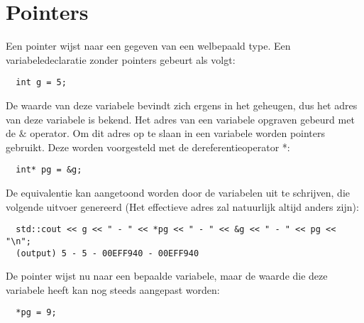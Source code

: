 \documentclass{report}
\begin{document}
	\tableofcontents

	\chapter{Pointers}
	Een pointer wijst naar een gegeven van een welbepaald type. Een variabeledeclaratie zonder pointers gebeurt als volgt:
	\begin{lstlisting}
  int g = 5;
	\end{lstlisting}
	De waarde van deze variabele bevindt zich ergens in het geheugen, dus het adres van deze variabele is bekend. Het adres van een variabele opgraven gebeurd met de $\&$ operator. Om dit adres op te slaan in een variabele worden pointers gebruikt. Deze worden voorgesteld met de dereferentieoperator *:
	\begin{lstlisting}
  int* pg = &g;
	\end{lstlisting}
	De equivalentie kan aangetoond worden door de variabelen uit te schrijven, die volgende uitvoer genereerd (Het effectieve adres zal natuurlijk altijd anders zijn):
	\begin{lstlisting}
  std::cout << g << " - " << *pg << " - " << &g << " - " << pg <<  "\n";
  (output) 5 - 5 - 00EFF940 - 00EFF940
	\end{lstlisting}
	
	De pointer wijst nu naar een bepaalde variabele, maar de waarde die deze variabele heeft kan nog steeds aangepast worden:
	\begin{lstlisting}
  *pg = 9;
	\end{lstlisting}
\end{document}
